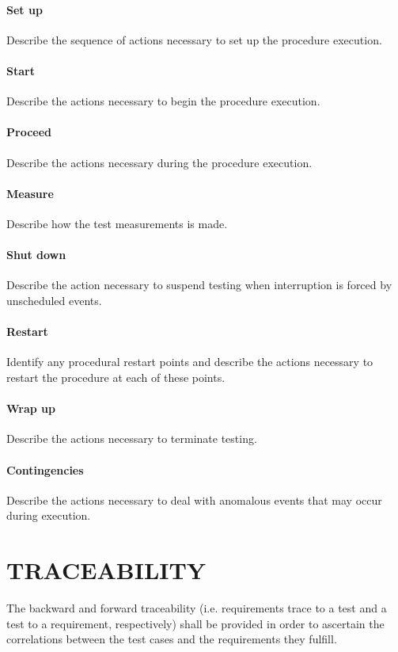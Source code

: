\documentclass[DM,lsstdraft,STS,toc]{lsstdoc}
\begin{document}
\paragraph{Set up \label{sect:proc_setup}}
Describe the sequence of actions necessary to set up the procedure execution.
\paragraph{Start \label{sect:proc_start}}
Describe the actions necessary to begin the procedure execution.
\paragraph{Proceed \label{sect:proc_proceed}}
Describe the actions necessary during the procedure execution.
\paragraph{Measure \label{sect:proc_measure}}
Describe how the test measurements is made.
\paragraph{Shut down \label{sect:proc_shutdown}}
Describe the action necessary to suspend testing when interruption is forced by unscheduled events.
\paragraph{Restart \label{sect:proc_restart}}
Identify any procedural restart points and describe the actions necessary to restart the procedure at each of these points.
\paragraph{Wrap up \label{sect:proc_wrapup}}
Describe the actions necessary to terminate testing.
\paragraph{Contingencies \label{sect:proc_contingencies}}
Describe the actions necessary to deal with anomalous events that may occur during execution.


\newpage

\appendix
\section{TRACEABILITY \label{sect:traceability}}
The backward and forward traceability (i.e. requirements trace to a test and a test to a requirement, respectively) shall be provided in order to
ascertain the correlations between the test cases and the requirements they fulfill.\\
\end{document}
